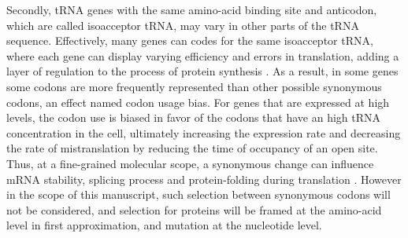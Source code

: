 Secondly, tRNA genes with the same amino-acid binding site and anticodon, which are called isoacceptor tRNA, may vary in other parts of the tRNA sequence.
Effectively, many genes can codes for the same isoacceptor tRNA, where each gene can display varying efficiency and errors in translation, adding a layer of regulation to the process of protein synthesis \citep{Lowe1997,Chan2008,Juhling2008,Lin2019}.
As a result, in some genes some codons are more frequently represented than other possible synonymous codons, an effect named codon usage bias.
For genes that are expressed at high levels, the codon use is biased in favor of the codons that have an high tRNA concentration in the cell, ultimately increasing the expression rate and decreasing the rate of mistranslation by reducing the time of occupancy of an open site.
Thus, at a fine-grained molecular scope, a synonymous change can influence mRNA stability, splicing process and protein-folding during translation \citep{Plotkin2011, Rak2018}.
However in the scope of this manuscript, such selection between synonymous codons will not be considered, and selection for proteins will be framed at the amino-acid level in first approximation, and mutation at the nucleotide level.
